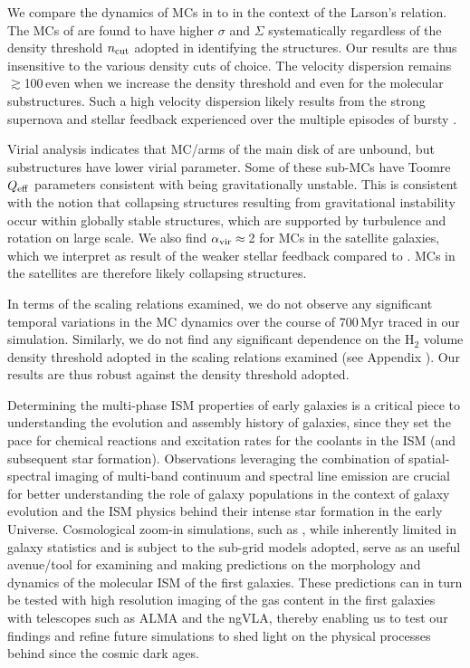 \IfFileExists{emulateapjlegacy.cls}{\documentclass[iop]{emulateapjlegacy}}{\documentclass[iop]{emulateapj}}
\begin{document}
We compare the dynamics of MCs in \flower to \obs in the context of the Larson's relation.
The MCs of \flower are found to have higher $\sigma$ and $\Sigma$ systematically regardless of the 
density threshold $n_{\rm cut}$ adopted in identifying the structures.
Our results are thus insensitive to the various density cuts of choice.
The velocity dispersion remains $\gtrsim$100\,\kms even when we increase the 
density threshold and even for the molecular substructures.
Such a high velocity dispersion likely results from
the strong supernova and stellar feedback \flower experienced over the multiple episodes of bursty \SF.

Virial analysis indicates that MC/arms of the main disk of \flower are unbound, but substructures have
lower virial parameter. Some of these sub-MCs have Toomre $Q_{\rm eff}$ parameters consistent with being 
gravitationally unstable. This is consistent with the notion that collapsing structures resulting from
gravitational instability occur within globally stable structures, which are
supported by turbulence and rotation on large scale.
We also find $\alpha_{\rm vir}\approx$\,2 for MCs in the satellite galaxies, which we interpret as
result of the weaker stellar feedback compared to \flower.
MCs in the satellites are therefore likely collapsing structures.

In terms of the scaling relations examined, we do not observe any significant
temporal variations in the MC dynamics over the course of 700\,Myr traced in our simulation.
Similarly, we do not find any significant dependence on the H$_2$ volume density threshold adopted
in the scaling relations examined (see Appendix ). 
Our results are thus robust against the density threshold adopted.

Determining the multi-phase ISM properties of early galaxies
is a critical piece to understanding the evolution and
assembly history of galaxies, since they set the pace
for chemical reactions and excitation rates for the coolants in the ISM (and subsequent star formation).
Observations leveraging the combination of spatial-spectral imaging of
multi-band continuum and spectral line emission are crucial for better understanding
the role of \highz galaxy populations
in the context of galaxy evolution and the ISM physics behind their intense star formation in the early Universe.
Cosmological zoom-in simulations, such as , while inherently limited in galaxy
statistics and is subject to the sub-grid models adopted, 
serve as an useful avenue/tool for examining and making predictions on the morphology and dynamics of
the molecular ISM of the first galaxies.
These predictions can in turn be
tested with high resolution imaging of the gas content in the first galaxies with telescopes such as ALMA and the ngVLA, thereby 
enabling us to test our findings and refine future simulations to shed light on the physical processes behind 
\SF since the cosmic dark ages.
\end{document}
